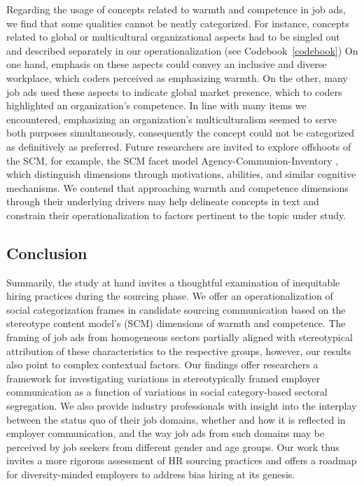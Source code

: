 \documentclass[man]{apa7}
\begin{document}
Regarding the usage of concepts related to warmth and competence in job ads, we find that some qualities cannot be neatly categorized. For instance, concepts related to global or multicultural organizational aspects had to be singled out and described separately in our operationalization (see Codebook~\ref{codebook}) On one hand, emphasis on these aspects could convey an inclusive and diverse workplace, which coders perceived as emphasizing warmth. On the other, many job ads used these aspects to indicate global market presence, which to coders highlighted an organization’s competence. In line with many items we encountered, emphasizing an organization’s multiculturalism seemed to serve both purposes simultaneously, consequently the concept could not be categorized as definitively as preferred. Future researchers are invited to explore offshoots of the SCM, for example, the SCM facet model Agency-Communion-Inventory \parencite[AC-IN;][]{abele_facets_2016}, which distinguish dimensions through motivations, abilities, and similar cognitive mechanisms. We contend that approaching warmth and competence dimensions through their underlying drivers may help delineate concepts in text and constrain their operationalization to factors pertinent to the topic under study.

\subsection{Conclusion}
Summarily, the study at hand invites a thoughtful examination of inequitable hiring practices during the sourcing phase. We offer an operationalization of social categorization frames in candidate sourcing communication based on the stereotype content model’s (SCM) dimensions of warmth and competence. The framing of job ads from homogeneous sectors partially aligned with stereotypical attribution of these characteristics to the respective groups, however, our results also point to complex contextual factors. Our findings offer researchers a framework for investigating variations in stereotypically framed employer communication as a function of variations in social category-based sectoral segregation. We also provide industry professionals with insight into the interplay between the status quo of their job domains, whether and how it is reflected in employer communication, and the way job ads from such domains may be perceived by job seekers from different gender and age groups. Our work thus invites a more rigorous assessment of HR sourcing practices and offers a roadmap for diversity-minded employers to address bias hiring at its genesis.

\end{document}
